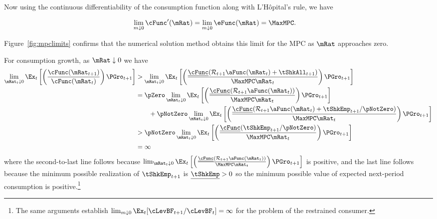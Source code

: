 \documentclass[BufferStockTheory]{subfiles}
\begin{document}
Now using the continuous differentiability of the consumption function
along with L'H\^opital's rule, we have
\begin{comment}
  \begin{align*}
    \eFunc^{\prime}(\mRat)  & = \mRat^{-1} \cFunc^{\prime}(\mRat) - \mRat^{-2} \cFunc(\mRat)
    \\ \mRat \eFunc^{\prime}(\mRat)  & = \cFunc^{\prime}(\mRat) - \cFunc(\mRat)/\mRat
    \\ \cFunc^{\prime}(\mRat)  & = \eFunc(\mRat)+ \mRat \eFunc^{\prime}(\mRat)
  \end{align*}
  and since $0<\eFunc(\mRat)<1$ we have
\end{comment}
\begin{equation}\begin{gathered}\begin{aligned}
  \lim_{m \downarrow 0} \cFunc^{\prime}(\mRat)  & = \lim_{m \downarrow 0}
                                                  \eFunc(\mRat) = \MaxMPC. \nonumber
\end{aligned}\end{gathered}\end{equation}

Figure~\ref{fig:mpclimits} confirms that the numerical solution method
obtains this limit for the MPC as $\mRat$ approaches zero.

For consumption growth, as $\mRat \downarrow 0$ we have
\begin{align*}
  \lim_{\mRat_{t} \downarrow 0} \Ex_{t}\left[\left(\frac{\cFunc({\mRat}_{t+1})}{\cFunc(\mRat_t)}\right){\PGro}_{t+1}\right]
  & > \lim_{\mRat_{t} \downarrow 0} \Ex_{t}\left[\left(\frac{\underline{\cFunc}({\mathcal{\mathcal{R}}}_{t+1}\aFunc(\mRat_{t})+{%
    \tShkAll}_{t+1})}{\MaxMPC \mRat_{t}}\right){\PGro}_{t+1}\right]  \notag \\
  & = \pZero \lim_{\mRat_{t} \downarrow 0} \Ex_{t}\left[\left(\frac{\underline{\cFunc}({\mathcal{\mathcal{R}}}_{t+1}\aFunc(\mRat_{t}))}{\MaxMPC \mRat_{t}}\right){\PGro}_{t+1}\right] \\
  & ~~~~~~ + \pNotZero \lim_{\mRat_{t} \downarrow 0}  \Ex_{t}\left[\left(\frac{\underline{\cFunc}({\mathcal{\mathcal{R}}}_{t+1}\aFunc(\mRat_{t})+
    \tShkEmp_{t+1}/\pNotZero)}{\MaxMPC \mRat_{t}}\right){\PGro}_{t+1}\right]  \\\notag
  & > \pNotZero \lim_{\mRat_{t} \downarrow 0} \Ex_{t}\left[\left(\frac{\underline{\cFunc}(
    \tShkEmp_{t+1}/\pNotZero)}{\MaxMPC \mRat_{t}}\right){\PGro}_{t+1}\right] \\
  & = \infty \nonumber
\end{align*}
where the second-to-last line follows because  $\lim_{\mRat_{t} \downarrow 0} \Ex_{t}\left[\left(\frac{\underline{\cFunc}({\mathcal{\mathcal{R}}}_{t+1}\aFunc(\mRat_{t}))}{\MaxMPC \mRat_{t}}\right){\PGro}_{t+1}\right]$ is positive, and the last line follows because the minimum possible realization of $\tShkEmp_{t+1}$ is $\underline{\tShkEmp}>0$ so the minimum possible value of expected next-period consumption is positive.\footnote{
  The same arguments establish $\lim_{m \downarrow 0} \Ex_{t}[\cLevBF_{t+1}/\cLevBF_{t}] = \infty$
  for the problem of the restrained consumer.%
}
\end{document}
